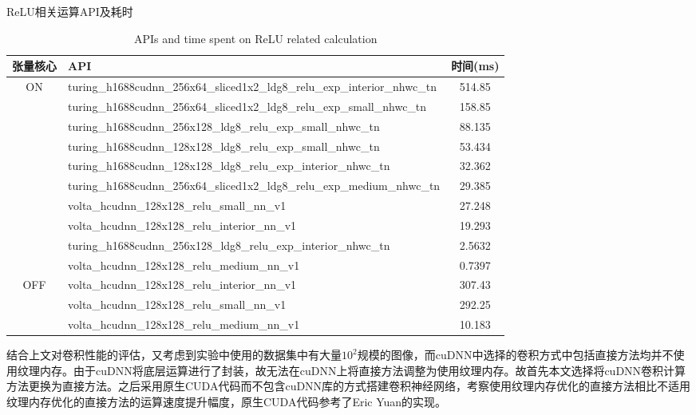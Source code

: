 \begin{table}
	\centering
	\renewcommand{\thetable}{\arabic{section}-\arabic{table} }
	\renewcommand{\tablename}{表}
	\caption{ReLU相关运算API及耗时}
	\addtocounter{table}{-1}
	\renewcommand{\thetable}{\arabic{section}-\arabic{table} }
	\renewcommand{\tablename}{Table}
	\caption{APIs and time spent on ReLU related calculation}
	\begin{tabular}{clc}
		\toprule
		张量核心 & API	&	时间(ms)\\
		\midrule
		ON & turing\_h1688cudnn\_256x64\_sliced1x2\_ldg8\_relu\_exp\_interior\_nhwc\_tn & 514.85\\
		   & turing\_h1688cudnn\_256x64\_sliced1x2\_ldg8\_relu\_exp\_small\_nhwc\_tn & 158.85\\
		   & turing\_h1688cudnn\_256x128\_ldg8\_relu\_exp\_small\_nhwc\_tn & 88.135\\
		   & turing\_h1688cudnn\_128x128\_ldg8\_relu\_exp\_small\_nhwc\_tn & 53.434\\
		   & turing\_h1688cudnn\_128x128\_ldg8\_relu\_exp\_interior\_nhwc\_tn & 32.362\\
		   & turing\_h1688cudnn\_256x64\_sliced1x2\_ldg8\_relu\_exp\_medium\_nhwc\_tn & 29.385\\
		   & volta\_hcudnn\_128x128\_relu\_small\_nn\_v1 & 27.248\\
		   & volta\_hcudnn\_128x128\_relu\_interior\_nn\_v1 & 19.293\\
		   & turing\_h1688cudnn\_256x128\_ldg8\_relu\_exp\_interior\_nhwc\_tn & 2.5632\\
		   & volta\_hcudnn\_128x128\_relu\_medium\_nn\_v1 & 0.7397\\
		\midrule
		OFF& volta\_hcudnn\_128x128\_relu\_interior\_nn\_v1 & 307.43\\
		   & volta\_hcudnn\_128x128\_relu\_small\_nn\_v1 & 292.25\\
		   & volta\_hcudnn\_128x128\_relu\_medium\_nn\_v1 & 10.183\\
		\bottomrule
	\end{tabular} \label{table-RELU} 
\end{table}
\par 结合上文对卷积性能的评估，又考虑到实验中使用的数据集中有大量$ 10^2 $规模的图像，而cuDNN中选择的卷积方式中包括直接方法均并不使用纹理内存。由于cuDNN将底层运算进行了封装，故无法在cuDNN上将直接方法调整为使用纹理内存。故首先本文选择将cuDNN卷积计算方法更换为直接方法。之后采用原生CUDA代码而不包含cuDNN库的方式搭建卷积神经网络，考察使用纹理内存优化的直接方法相比不适用纹理内存优化的直接方法的运算速度提升幅度，原生CUDA代码参考了Eric Yuan的实现\cite{ERICYUAN}。
